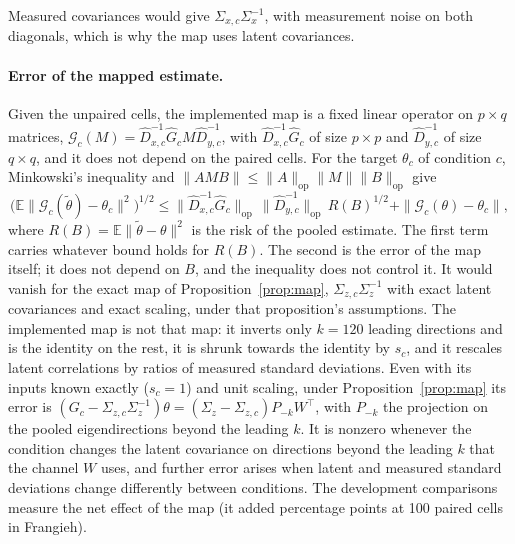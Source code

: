 Measured covariances would give $\Sigma_{x,c}\Sigma_x^{-1}$, with measurement noise on both diagonals, which is why the map uses latent covariances.

\paragraph{Error of the mapped estimate.} Given the unpaired cells, the implemented map is a fixed linear operator on $p\times q$ matrices, $\mathcal{G}_c(M)=\hat D_{x,c}^{-1}\hat G_cM\hat D_{y,c}^{-1}$, with $\hat D_{x,c}^{-1}\hat G_c$ of size $p\times p$ and $\hat D_{y,c}^{-1}$ of size $q\times q$, and it does not depend on the paired cells. For the target $\theta_c$ of condition $c$, Minkowski's inequality and $\|AMB\|\le\|A\|_{\mathrm{op}}\|M\|\|B\|_{\mathrm{op}}$ give
\[
\big(\mathbb{E}\|\mathcal{G}_c(\tilde\theta)-\theta_c\|^2\big)^{1/2}\le\|\hat D_{x,c}^{-1}\hat G_c\|_{\mathrm{op}}\,\|\hat D_{y,c}^{-1}\|_{\mathrm{op}}\,R(B)^{1/2}+\|\mathcal{G}_c(\theta)-\theta_c\|,
\]
where $R(B)=\mathbb{E}\|\tilde\theta-\theta\|^2$ is the risk of the pooled estimate. The first term carries whatever bound holds for $R(B)$. The second is the error of the map itself; it does not depend on $B$, and the inequality does not control it. It would vanish for the exact map of Proposition~\ref{prop:map}, $\Sigma_{z,c}\Sigma_z^{-1}$ with exact latent covariances and exact scaling, under that proposition's assumptions. The implemented map is not that map: it inverts only $k=120$ leading directions and is the identity on the rest, it is shrunk towards the identity by $s_c$, and it rescales latent correlations by ratios of measured standard deviations. Even with its inputs known exactly ($s_c=1$) and unit scaling, under Proposition~\ref{prop:map} its error is $(G_c-\Sigma_{z,c}\Sigma_z^{-1})\theta=(\Sigma_z-\Sigma_{z,c})P_{-k}W^\top$, with $P_{-k}$ the projection on the pooled eigendirections beyond the leading $k$. It is nonzero whenever the condition changes the latent covariance on directions beyond the leading $k$ that the channel $W$ uses, and further error arises when latent and measured standard deviations change differently between conditions. The development comparisons measure the net effect of the map (it added \SpFrMapGain{} percentage points at 100 paired cells in Frangieh).

